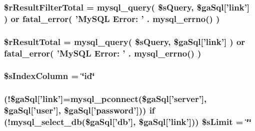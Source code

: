 \hypertarget{post_8php_a29b3b8a9782e4c5b8157be2ba70a33e1}{
\subsubsection[{\$r\+Result\+Filter\+Total}]{\setlength{\rightskip}{0pt plus 5cm}\$r\+Result\+Filter\+Total = mysql\+\_\+query( \$s\+Query, \$ga\+Sql\mbox{[}'link'\mbox{]} ) or {\bf fatal\+\_\+error}( 'My\+S\+Q\+L Error\+: ' . mysql\+\_\+errno() )}}\label{post_8php_a29b3b8a9782e4c5b8157be2ba70a33e1}
\hypertarget{post_8php_a48722b6bbefe9d4cb748bf0c3f936272}{
\subsubsection[{\$r\+Result\+Total}]{\setlength{\rightskip}{0pt plus 5cm}\$r\+Result\+Total = mysql\+\_\+query( \$s\+Query, \$ga\+Sql\mbox{[}'link'\mbox{]} ) or {\bf fatal\+\_\+error}( 'My\+S\+Q\+L Error\+: ' . mysql\+\_\+errno() )}}\label{post_8php_a48722b6bbefe9d4cb748bf0c3f936272}
\hypertarget{post_8php_a8bddf0b8ded9777b9068de5fa9e217a2}{
\subsubsection[{\$s\+Index\+Column}]{\setlength{\rightskip}{0pt plus 5cm}\$s\+Index\+Column = \char`\"{}id\char`\"{}}}\label{post_8php_a8bddf0b8ded9777b9068de5fa9e217a2}
\hypertarget{post_8php_a867f070c3b4e597275c622aac60de587}{
\subsubsection[{\$s\+Limit}]{ (!\$ga\+Sql\mbox{[}'link'\mbox{]}=mysql\+\_\+pconnect(\$ga\+Sql\mbox{[}'server'\mbox{]}, \$ga\+Sql\mbox{[}'user'\mbox{]}, \$ga\+Sql\mbox{[}'password'\mbox{]})) {\bf if} (!mysql\+\_\+select\+\_\+db(\$ga\+Sql\mbox{[}'db'\mbox{]}, \$ga\+Sql\mbox{[}'link'\mbox{]})) \$s\+Limit = \char`\"{}\char`\"{}}}\label{post_8php_a867f070c3b4e597275c622aac60de587}
